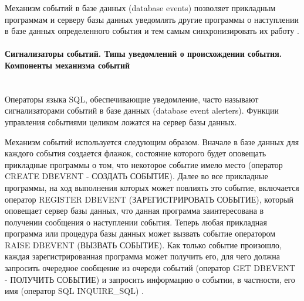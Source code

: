 Механизм событий в базе данных (database events) позволяет прикладным программам и серверу базы данных уведомлять другие программы о наступлении в базе данных определенного события и тем самым синхронизировать их работу \autocite{OSP}.

\paragraph{Сигнализаторы событий. Типы уведомлений о происхождении события. Компоненты механизма событий} ~\\

Операторы языка SQL, обеспечивающие уведомление, часто называют сигнализаторами событий в базе данных (database event alerters). Функции управления событиями целиком ложатся на сервер базы данных.

Механизм событий используется следующим образом. Вначале в базе данных для каждого события создается флажок, состояние которого будет оповещать прикладные программы о том, что некоторое событие имело место (оператор CREATE DBEVENT - СОЗДАТЬ СОБЫТИЕ). Далее во все прикладные программы, на ход выполнения которых может повлиять это событие, включается оператор REGISTER DBEVENT (ЗАРЕГИСТРИРОВАТЬ СОБЫТИЕ), который оповещает сервер базы данных, что данная программа заинтересована в получении сообщения о наступлении события. Теперь любая прикладная программа или процедура базы данных может вызвать событие оператором RAISE DBEVENT (ВЫЗВАТЬ СОБЫТИЕ). Как только событие произошло, каждая зарегистрированная программа может получить его, для чего должна запросить очередное сообщение из очереди событий (оператор GET DBEVENT - ПОЛУЧИТЬ СОБЫТИЕ) и запросить информацию о событии, в частности, его имя (оператор SQL INQUIRE\_SQL) \autocite{OSP}.